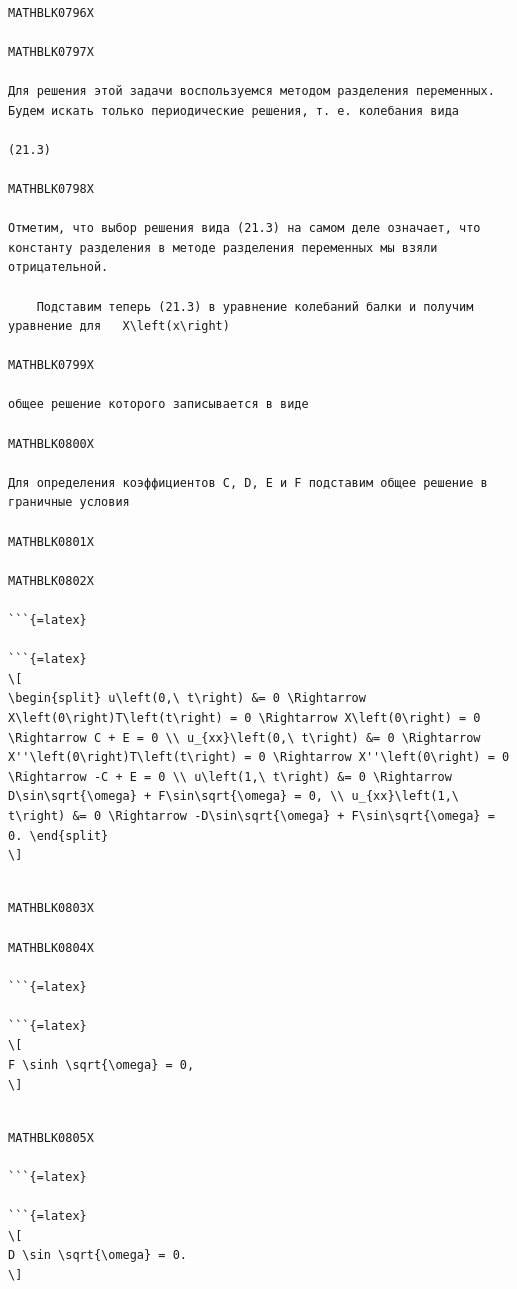 \documentclass[
]{article}
\begin{document}
\begin{verbatim}

MATHBLK0796X

MATHBLK0797X

Для решения этой задачи воспользуемся методом разделения переменных. Будем искать только периодические решения, т. е. колебания вида

(21.3)

MATHBLK0798X

Отметим, что выбор решения вида (21.3) на самом деле означает, что константу разделения в методе разделения переменных мы взяли отрицательной.

    Подставим теперь (21.3) в уравнение колебаний балки и получим уравнение для   X\left(x\right) 

MATHBLK0799X

общее решение которого записывается в виде

MATHBLK0800X

Для определения коэффициентов C, D, E и F подставим общее решение в граничные условия

MATHBLK0801X

MATHBLK0802X

```{=latex}

```{=latex}
\[
\begin{split} u\left(0,\ t\right) &= 0 \Rightarrow X\left(0\right)T\left(t\right) = 0 \Rightarrow X\left(0\right) = 0 \Rightarrow C + E = 0 \\ u_{xx}\left(0,\ t\right) &= 0 \Rightarrow X''\left(0\right)T\left(t\right) = 0 \Rightarrow X''\left(0\right) = 0 \Rightarrow -C + E = 0 \\ u\left(1,\ t\right) &= 0 \Rightarrow D\sin\sqrt{\omega} + F\sin\sqrt{\omega} = 0, \\ u_{xx}\left(1,\ t\right) &= 0 \Rightarrow -D\sin\sqrt{\omega} + F\sin\sqrt{\omega} = 0. \end{split}
\]
\end{verbatim}

\begin{verbatim}

MATHBLK0803X

MATHBLK0804X

```{=latex}

```{=latex}
\[
F \sinh \sqrt{\omega} = 0,
\]
\end{verbatim}

\begin{verbatim}

MATHBLK0805X

```{=latex}

```{=latex}
\[
D \sin \sqrt{\omega} = 0.
\]
\end{verbatim}
\end{document}
